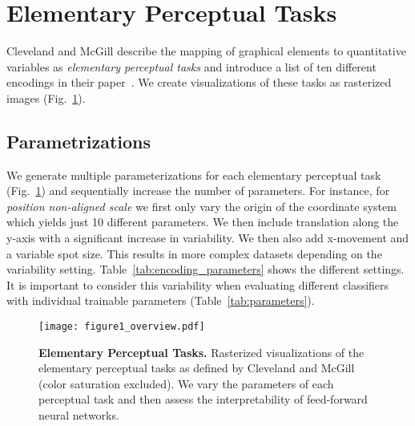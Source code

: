 \section{Elementary Perceptual Tasks}

Cleveland and McGill describe the mapping of graphical elements to quantitative variables as \emph{elementary perceptual tasks} and introduce a list of ten different encodings in their paper~\cite{cleveland_mcgill}. We create visualizations of these tasks as rasterized images (Fig.~\ref{fig:elementary_perceptual_tasks}).

\subsection{Parametrizations}
\label{sec:parametrizations}
We generate multiple parameterizations for each elementary perceptual task (Fig.~\ref{fig:elementary_perceptual_tasks}) and sequentially increase the number of parameters. For instance, for \emph{position non-aligned scale} we first only vary the origin of the coordinate system which yields just 10 different parameters. We then include translation along the y-axis with a significant increase in variability. We then also add x-movement and a variable spot size. This results in more complex datasets depending on the variability setting. Table~\ref{tab:encoding_parameters} shows the different settings. It is important to consider this variability when evaluating different classifiers with individual trainable parameters (Table~\ref{tab:parameters}).

\begin{figure}[t]
	  \texttt{[image: figure1\_overview.pdf]}
  \caption{\textbf{Elementary Perceptual Tasks.} Rasterized visualizations of the elementary perceptual tasks as defined by Cleveland and McGill~\cite{cleveland_mcgill} (color saturation excluded). We vary the parameters of each perceptual task and then assess the interpretability of feed-forward neural networks.}
	\label{fig:elementary_perceptual_tasks}
\end{figure}

